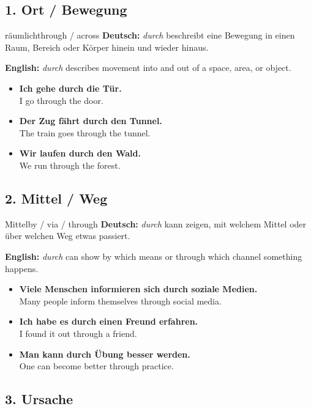 \documentclass[a4paper,11pt]{article}
\newcommand{\GermanText}[1]{\textbf{Deutsch: }#1\par}
\newcommand{\EnglishText}[1]{{\small\color{SoftGray}\textbf{English: }#1\par}}
\newcommand{\ExampleItem}[2]{\item \textbf{#1}\\{\small\color{SoftGray}#2}}
\begin{document}
\subsection{1. Ort / Bewegung}

\begin{grammarentry}{räumlich}{through / across}
\GermanText{\textit{durch} beschreibt eine Bewegung in einen Raum, Bereich oder Körper hinein und wieder hinaus.}
\EnglishText{\textit{durch} describes movement into and out of a space, area, or object.}

\begin{exbox}
\begin{itemize}
    \ExampleItem{Ich gehe durch die Tür.}{I go through the door.}
    \ExampleItem{Der Zug fährt durch den Tunnel.}{The train goes through the tunnel.}
    \ExampleItem{Wir laufen durch den Wald.}{We run through the forest.}
\end{itemize}
\end{exbox}
\end{grammarentry}

\subsection{2. Mittel / Weg}

\begin{grammarentry}{Mittel}{by / via / through}
\GermanText{\textit{durch} kann zeigen, mit welchem Mittel oder über welchen Weg etwas passiert.}
\EnglishText{\textit{durch} can show by which means or through which channel something happens.}

\begin{exbox}
\begin{itemize}
    \ExampleItem{Viele Menschen informieren sich durch soziale Medien.}{Many people inform themselves through social media.}
    \ExampleItem{Ich habe es durch einen Freund erfahren.}{I found it out through a friend.}
    \ExampleItem{Man kann durch Übung besser werden.}{One can become better through practice.}
\end{itemize}
\end{exbox}
\end{grammarentry}

\subsection{3. Ursache}
\end{document}
